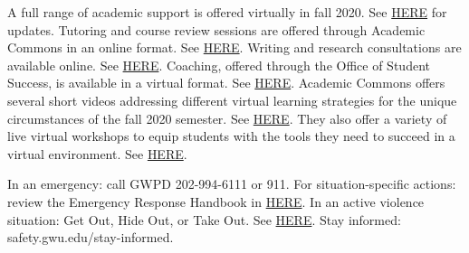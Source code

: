 \documentclass[
  letterpaper,
  DIV=11,
  numbers=noendperiod]{scrreprt}
\begin{document}
\begin{tcolorbox}[enhanced jigsaw, toprule=.15mm, leftrule=.75mm, coltitle=black, left=2mm, opacityback=0, titlerule=0mm, arc=.35mm, toptitle=1mm, opacitybacktitle=0.6, bottomtitle=1mm, colframe=quarto-callout-tip-color-frame, title=\textcolor{quarto-callout-tip-color}{\faLightbulb}\hspace{0.5em}{Virtual Academic Support}, rightrule=.15mm, bottomrule=.15mm, colbacktitle=quarto-callout-tip-color!10!white, breakable, colback=white]

A full range of academic support is offered virtually in fall 2020. See
\href{coronavirus.gwu.edu/top-faqs}{HERE} for updates. Tutoring and
course review sessions are offered through Academic Commons in an online
format. See \href{academiccommons.gwu.edu/tutoring}{HERE}. Writing and
research consultations are available online. See
\href{academiccommons.gwu.edu/writing-research-help}{HERE}. Coaching,
offered through the Office of Student Success, is available in a virtual
format. See
\href{studentsuccess.gwu.edu/academic-program-support}{HERE}. Academic
Commons offers several short videos addressing different virtual
learning strategies for the unique circumstances of the fall 2020
semester. See \href{academiccommons.gwu.edu/study-skills}{HERE}. They
also offer a variety of live virtual workshops to equip students with
the tools they need to succeed in a virtual environment. See
\href{tinyurl.com/gw-virtual-learning}{HERE}.

\end{tcolorbox}

\begin{tcolorbox}[enhanced jigsaw, toprule=.15mm, leftrule=.75mm, coltitle=black, left=2mm, opacityback=0, titlerule=0mm, arc=.35mm, toptitle=1mm, opacitybacktitle=0.6, bottomtitle=1mm, colframe=quarto-callout-warning-color-frame, title=\textcolor{quarto-callout-warning-color}{\faExclamationTriangle}\hspace{0.5em}{Safety and Security}, rightrule=.15mm, bottomrule=.15mm, colbacktitle=quarto-callout-warning-color!10!white, breakable, colback=white]

In an emergency: call GWPD 202-994-6111 or 911. For situation-specific
actions: review the Emergency Response Handbook in
\href{safety.gwu.edu/emergency-response-handbook}{HERE}. In an active
violence situation: Get Out, Hide Out, or Take Out. See
\href{go.gwu.edu/shooterpret}{HERE}. Stay informed:
safety.gwu.edu/stay-informed.

\end{tcolorbox}
\end{document}
